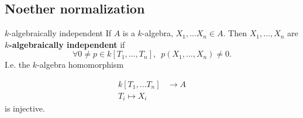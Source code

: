 \documentclass{article}
\begin{document}
\subsection{Noether normalization}
\begin{fancydefine}{$k$-algebraically independent}
    If $A$ is a $k$-algebra, $X_{1}, \dots X_{n} \in A$. Then $X_{1}, \dots, X_{n}$ are $k$\textbf{-algebraically independent} if \[ \forall 0 \neq p \in k[T_{1}, \dots, T_{n}], \,\,\, p(X_{1},\dots,X_{n}) \neq 0.\]
    I.e. the $k$-algebra homomorphism
    
    \begin{align*}
        k[T_{1},\dots T_{n}] &\to A\\
        T_{i} \mapsto X_{i}
    \end{align*}
    is injective.
\end{fancydefine}
\end{document}
